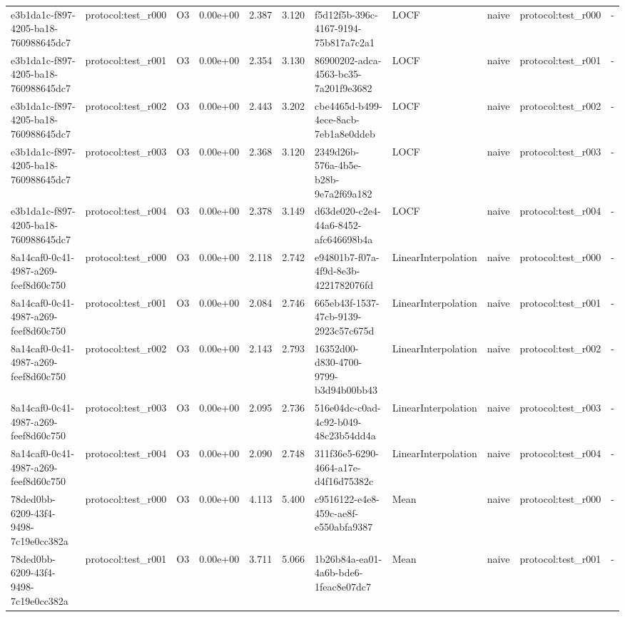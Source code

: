 \begin{table}[htbp]
\begin{tabular}{llrrr}
e3b1da1c-f897-4205-ba18-760988645dc7 & protocol:test\_r000 & O3 & 0.00e+00 & 2.387 & 3.120 & f5d12f5b-396c-4167-9194-75b817a7c2a1 & LOCF & naive & protocol:test\_r000 & - \\
e3b1da1c-f897-4205-ba18-760988645dc7 & protocol:test\_r001 & O3 & 0.00e+00 & 2.354 & 3.130 & 86900202-adca-4563-bc35-7a201f9e3682 & LOCF & naive & protocol:test\_r001 & - \\
e3b1da1c-f897-4205-ba18-760988645dc7 & protocol:test\_r002 & O3 & 0.00e+00 & 2.443 & 3.202 & cbe4465d-b499-4ece-8acb-7eb1a8e0ddeb & LOCF & naive & protocol:test\_r002 & - \\
e3b1da1c-f897-4205-ba18-760988645dc7 & protocol:test\_r003 & O3 & 0.00e+00 & 2.368 & 3.120 & 2349d26b-576a-4b5e-b28b-9e7a2f69a182 & LOCF & naive & protocol:test\_r003 & - \\
e3b1da1c-f897-4205-ba18-760988645dc7 & protocol:test\_r004 & O3 & 0.00e+00 & 2.378 & 3.149 & d63de020-c2e4-44a6-8452-afc646698b4a & LOCF & naive & protocol:test\_r004 & - \\
8a14caf0-0c41-4987-a269-feef8d60c750 & protocol:test\_r000 & O3 & 0.00e+00 & 2.118 & 2.742 & e94801b7-f07a-4f9d-8e3b-4221782076fd & LinearInterpolation & naive & protocol:test\_r000 & - \\
8a14caf0-0c41-4987-a269-feef8d60c750 & protocol:test\_r001 & O3 & 0.00e+00 & 2.084 & 2.746 & 665eb43f-1537-47cb-9139-2923c57c675d & LinearInterpolation & naive & protocol:test\_r001 & - \\
8a14caf0-0c41-4987-a269-feef8d60c750 & protocol:test\_r002 & O3 & 0.00e+00 & 2.143 & 2.793 & 16352d00-d830-4700-9799-b3d94b00bb43 & LinearInterpolation & naive & protocol:test\_r002 & - \\
8a14caf0-0c41-4987-a269-feef8d60c750 & protocol:test\_r003 & O3 & 0.00e+00 & 2.095 & 2.736 & 516e04dc-c0ad-4c92-b049-48c23b54dd4a & LinearInterpolation & naive & protocol:test\_r003 & - \\
8a14caf0-0c41-4987-a269-feef8d60c750 & protocol:test\_r004 & O3 & 0.00e+00 & 2.090 & 2.748 & 311f36e5-6290-4664-a17e-d4f16d75382c & LinearInterpolation & naive & protocol:test\_r004 & - \\
78ded0bb-6209-43f4-9498-7c19e0cc382a & protocol:test\_r000 & O3 & 0.00e+00 & 4.113 & 5.400 & c9516122-e4e8-459c-ae8f-e550abfa9387 & Mean & naive & protocol:test\_r000 & - \\
78ded0bb-6209-43f4-9498-7c19e0cc382a & protocol:test\_r001 & O3 & 0.00e+00 & 3.711 & 5.066 & 1b26b84a-ea01-4a6b-bde6-1feac8e07dc7 & Mean & naive & protocol:test\_r001 & - \\

\end{tabular}
\end{table}
